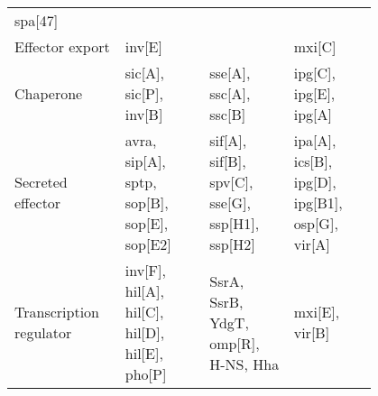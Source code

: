 \begin{table}
\begin{tabular}{L{0.2\linewidth}L{0.2\linewidth}L{0.2\linewidth}L{0.2\linewidth}}
      \acrshort{spa}[47] \\
    Effector export &
      \acrshort{inv}[E] &
      &
      \acrshort{mxi}[C] \\
    Chaperone &
      \acrshort{sic}[A], \acrshort{sic}[P], \acrshort{inv}[B] &
      \acrshort{sse}[A], \acrshort{ssc}[A], \acrshort{ssc}[B] &
      \acrshort{ipg}[C], \acrshort{ipg}[E], \acrshort{ipg}[A] \\
    Secreted effector &
      \acrshort{avra}, \acrshort{sip}[A], \acrshort{sptp}, \acrshort{sop}[B], \acrshort{sop}[E], \acrshort{sop}[E2] &
      \acrshort{sif}[A], \acrshort{sif}[B], \acrshort{spv}[C], \acrshort{sse}[G], \acrshort{ssp}[H1], \acrshort{ssp}[H2] &
      \acrshort{ipa}[A], \acrshort{ics}[B], \acrshort{ipg}[D], \acrshort{ipg}[B1], \acrshort{osp}[G], \acrshort{vir}[A] \\
    Transcription regulator &
      \acrshort{inv}[F], \acrshort{hil}[A], \acrshort{hil}[C], \acrshort{hil}[D], \acrshort{hil}[E], \acrshort{pho}[P] &
      SsrA, SsrB, YdgT, \acrshort{omp}[R], H-NS, Hha &
      \acrshort{mxi}[E], \acrshort{vir}[B] \\
      \hline
  \end{tabular}
\end{table}


